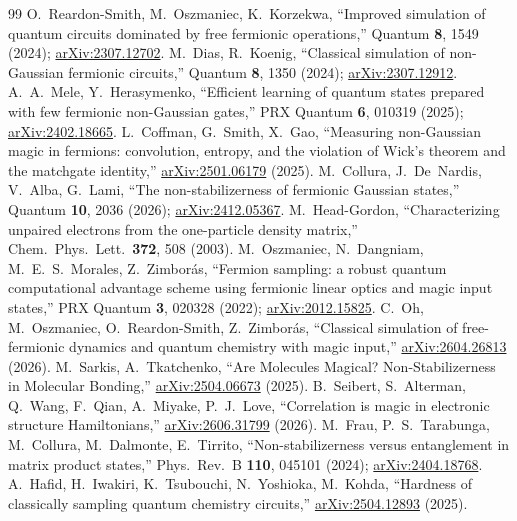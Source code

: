 \begin{thebibliography}{99}
 O.~Reardon-Smith, M.~Oszmaniec, K.~Korzekwa, ``Improved simulation of quantum circuits dominated by free fermionic operations,'' Quantum \textbf{8}, 1549 (2024); \href{https://arxiv.org/abs/2307.12702}{arXiv:2307.12702}.
 M.~Dias, R.~Koenig, ``Classical simulation of non-Gaussian fermionic circuits,'' Quantum \textbf{8}, 1350 (2024); \href{https://arxiv.org/abs/2307.12912}{arXiv:2307.12912}.
 A.~A.~Mele, Y.~Herasymenko, ``Efficient learning of quantum states prepared with few fermionic non-Gaussian gates,'' PRX Quantum \textbf{6}, 010319 (2025); \href{https://arxiv.org/abs/2402.18665}{arXiv:2402.18665}.
 L.~Coffman, G.~Smith, X.~Gao, ``Measuring non-Gaussian magic in fermions: convolution, entropy, and the violation of Wick's theorem and the matchgate identity,'' \href{https://arxiv.org/abs/2501.06179}{arXiv:2501.06179} (2025).
 M.~Collura, J.~De~Nardis, V.~Alba, G.~Lami, ``The non-stabilizerness of fermionic Gaussian states,'' Quantum \textbf{10}, 2036 (2026); \href{https://arxiv.org/abs/2412.05367}{arXiv:2412.05367}.
 M.~Head-Gordon, ``Characterizing unpaired electrons from the one-particle density matrix,'' Chem.\ Phys.\ Lett.\ \textbf{372}, 508 (2003).
 M.~Oszmaniec, N.~Dangniam, M.~E.~S.~Morales, Z.~Zimbor\'as, ``Fermion sampling: a robust quantum computational advantage scheme using fermionic linear optics and magic input states,'' PRX Quantum \textbf{3}, 020328 (2022); \href{https://arxiv.org/abs/2012.15825}{arXiv:2012.15825}.
 C.~Oh, M.~Oszmaniec, O.~Reardon-Smith, Z.~Zimbor\'as, ``Classical simulation of free-fermionic dynamics and quantum chemistry with magic input,'' \href{https://arxiv.org/abs/2604.26813}{arXiv:2604.26813} (2026).
 M.~Sarkis, A.~Tkatchenko, ``Are Molecules Magical? Non-Stabilizerness in Molecular Bonding,'' \href{https://arxiv.org/abs/2504.06673}{arXiv:2504.06673} (2025).
 B.~Seibert, S.~Alterman, Q.~Wang, F.~Qian, A.~Miyake, P.~J.~Love, ``Correlation is magic in electronic structure Hamiltonians,'' \href{https://arxiv.org/abs/2606.31799}{arXiv:2606.31799} (2026).
 M.~Frau, P.~S.~Tarabunga, M.~Collura, M.~Dalmonte, E.~Tirrito, ``Non-stabilizerness versus entanglement in matrix product states,'' Phys.\ Rev.\ B \textbf{110}, 045101 (2024); \href{https://arxiv.org/abs/2404.18768}{arXiv:2404.18768}.
 A.~Hafid, H.~Iwakiri, K.~Tsubouchi, N.~Yoshioka, M.~Kohda, ``Hardness of classically sampling quantum chemistry circuits,'' \href{https://arxiv.org/abs/2504.12893}{arXiv:2504.12893} (2025).

\end{thebibliography}

